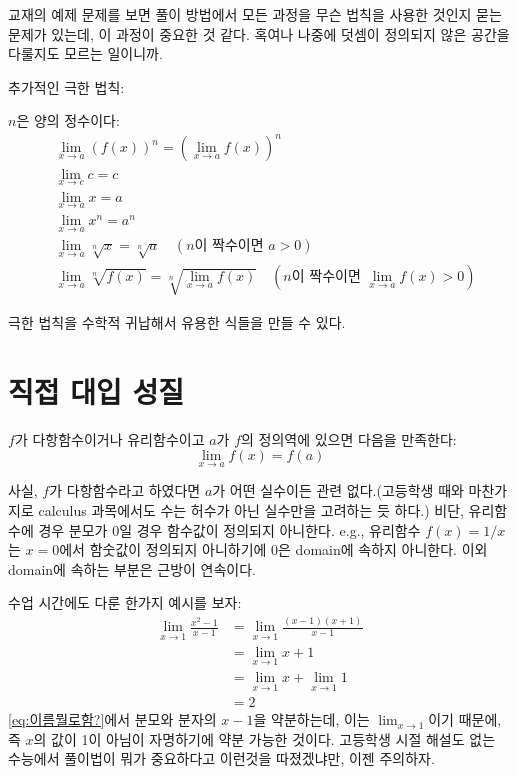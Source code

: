 \documentclass[../note.tex]{subfiles}
\begin{document}
교재의 예제 문제를 보면 풀이 방법에서 모든 과정을 무슨 법칙을 사용한 것인지 묻는 문제가 있는데, 이 과정이 중요한 것 같다. 혹여나 나중에 덧셈이 정의되지 않은 공간을 다룰지도 모르는 일이니까.

추가적인 극한 법칙:
\begin{theorem}
  $n$은 양의 정수이다:
  \begin{align}
    &\lim_{x \to a} \left(f(x)\right)^n = \left(\lim_{x \to a} f(x)\right)^n \\
    &\lim_{x \to c} c = c \\
    &\lim_{x \to a} x = a \\
    &\lim_{x \to a} x^n = a^n \\
    &\lim_{x \to a} \sqrt[n]{x} = \sqrt[n]{a}\quad (n\text{이 짝수이면 } a>0) \\
    &\lim_{x \to a} \sqrt[n]{f(x)} = \sqrt[n]{\lim_{x \to a} f(x)} \quad (n\text{이 짝수이면 } \lim_{x \to a} f(x)>0)
  \end{align}
\end{theorem}
극한 법칙을 수학적 귀납해서 유용한 식들을 만들 수 있다.

\section{직접 대입 성질}
\begin{theorem}[직접 대입 성질]
  $f$가 다항함수이거나 유리함수이고 $a$가 $f$의 정의역에 있으면 다음을 만족한다:
  \begin{equation}
    \lim_{x \to a} f(x) = f(a)
  \end{equation}
\end{theorem}
사실, $f$가 다항함수라고 하였다면 $a$가 어떤 실수이든 관련 없다.(고등학생 때와 마찬가지로 calculus 과목에서도 수는 허수가 아닌 실수만을 고려하는 듯 하다.) 비단, 유리함수에 경우 분모가 0일 경우 함수값이 정의되지 아니한다. e.g., 유리함수 $f(x) = 1/x$는 $x=0$에서 함숫값이 정의되지 아니하기에 0은 domain에 속하지 아니한다. 이외 domain에 속하는 부분은 근방이 연속이다.

\begin{note}
  수업 시간에도 다룬 한가지 예시를 보자:
  \begin{align}
    \lim_{x \to 1} \frac{x^2 - 1}{x - 1}& = \lim_{x \to 1} \frac{(x-1)(x+1)}{x-1}\label{eq:이름뭘로함?} \\
                                        & = \lim_{x \to 1} x + 1 \\
                                        & = \lim_{x \to 1} x + \lim_{x \to 1} 1 \\
                                        & = 2
  \end{align}
  \ref{eq:이름뭘로함?}에서 분모와 분자의 $x-1$을 약분하는데, 이는 $\lim_{x \to 1}$이기 때문에, 즉 $x$의 값이 1이 아님이 자명하기에 약분 가능한 것이다. 고등학생 시절 해설도 없는 수능에서 풀이법이 뭐가 중요하다고 이런것을 따졌겠냐만, 이젠 주의하자.
\end{note}
\end{document}
